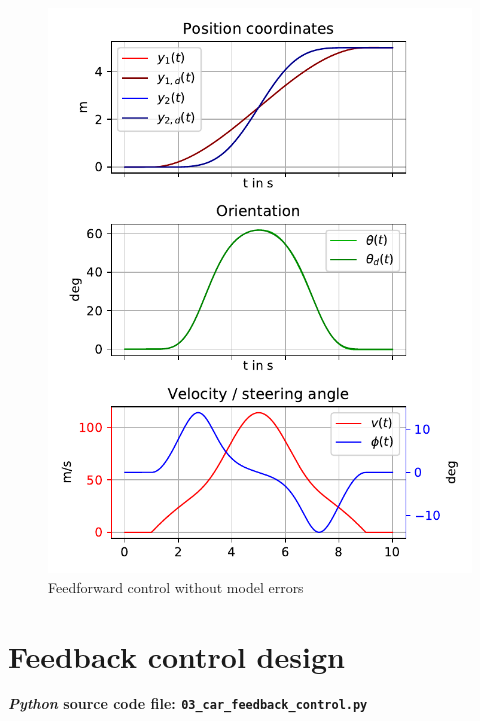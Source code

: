 \documentclass[a4paper,11pt,headings=standardclasses,parskip=half]{scrartcl}
\newcommand{\py}{\emph{Python}\xspace}
\begin{document}
\begin{figure}[ht]
\centering
\includegraphics[scale=1]{img/control_trajectory.pdf}
\caption{Feedforward control without model errors}
\label{fig:control_trajectory}
\end{figure}
\clearpage
\section{Feedback control design}
\label{sec:fbcontrol}
\textbf{\py source code file: \texttt{03\_car\_feedback\_control.py}}
\end{document}
